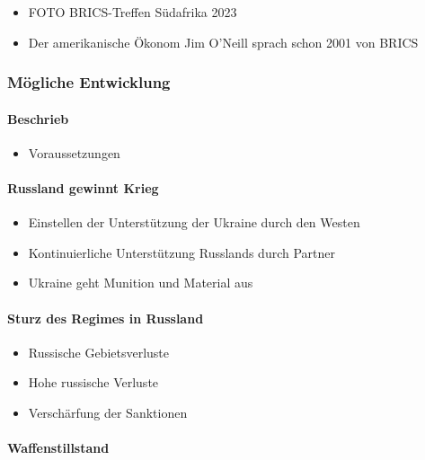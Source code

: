 {}\documentclass[a4paper]{article}
\providecommand{\tightlist}{\setlength{\itemsep}{1mm}\setlength{\parskip}{1mm}}
\begin{document}
\begin{itemize}
	\tightlist
	\item
	      FOTO BRICS-Treffen Südafrika 2023
	\item
	      Der amerikanische Ökonom Jim O'Neill sprach schon 2001 von BRICS
\end{itemize}

\subsubsection{Mögliche Entwicklung}\label{muxf6gliche-entwicklung}

\paragraph{Beschrieb}\label{beschrieb}

\begin{itemize}
	\tightlist
	\item
	      Voraussetzungen
\end{itemize}

\paragraph{Russland gewinnt Krieg}\label{russland-gewinnt-krieg}

\begin{itemize}
	\tightlist
	\item
	      Einstellen der Unterstützung der Ukraine durch den Westen
	\item
	      Kontinuierliche Unterstützung Russlands durch Partner
	\item
	      Ukraine geht Munition und Material aus
\end{itemize}

\paragraph{Sturz des Regimes in
	Russland}\label{sturz-des-regimes-in-russland}

\begin{itemize}
	\tightlist
	\item
	      Russische Gebietsverluste
	\item
	      Hohe russische Verluste
	\item
	      Verschärfung der Sanktionen
\end{itemize}

\paragraph{Waffenstillstand}\label{waffenstillstand-1}
\end{document}
